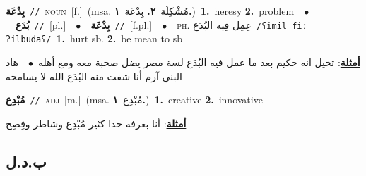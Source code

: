 \documentclass[10pt,a4paper,twoside]{article} %
\begin{document}
\begin{multicols}{2}
{\setlength\topsep{0pt}\textbf{\foreignlanguage{arabic}{بِدْعَة}}\ {\color{gray}\texttt{//}\color{black}}\ \textsc{noun}\ [f.]\ \color{gray}(msa. \foreignlanguage{arabic}{مُشْكِلَة}~\foreignlanguage{arabic}{\textbf{٢.}}  \foreignlanguage{arabic}{بِدْعَة}~\foreignlanguage{arabic}{\textbf{١.}})\color{black}\ \textbf{1.}~heresy  \textbf{2.}~problem\ \ $\bullet$\ \ \setlength\topsep{0pt}\textbf{\foreignlanguage{arabic}{بُدَع}}\ {\color{gray}\texttt{//}\color{black}}\ [pl.]\ \ $\bullet$\ \ \setlength\topsep{0pt}\textbf{\foreignlanguage{arabic}{بِدْعَة}}\ {\color{gray}\texttt{//}\color{black}}\ [f.pl.]\ \ $\bullet$\ \ \textsc{ph.} \color{gray} \foreignlanguage{arabic}{عِمِل فِيه البُدَع}\color{black}\ {\color{gray}\texttt{/{\sffamily ʕimil fiː ʔilbudaʕ}/}\color{black}}\ \textbf{1.}~hurt sb.  \textbf{2.}~be mean to sb\  \begin{flushright}\color{gray}\foreignlanguage{arabic}{\textbf{\underline{\foreignlanguage{arabic}{أمثلة}}}: تخيل انه حكيم بعد ما عمل فيه البُدَع لسة مصر يضل صحبة معه ومع أهله\ $\bullet$\ \  هاد البني آرم أنا شفت منه البُدَع الله لا يسامحه}\end{flushright}\color{black}} \vspace{2mm}

{\setlength\topsep{0pt}\textbf{\foreignlanguage{arabic}{مُبْدِع}}\ {\color{gray}\texttt{//}\color{black}}\ \textsc{adj}\ [m.]\ \color{gray}(msa. \foreignlanguage{arabic}{مُبْدِع}~\foreignlanguage{arabic}{\textbf{١.}})\color{black}\ \textbf{1.}~creative  \textbf{2.}~innovative\  \begin{flushright}\color{gray}\foreignlanguage{arabic}{\textbf{\underline{\foreignlanguage{arabic}{أمثلة}}}: أنا بعرفه حدا كثير مُبْدِع وشاطر وفِصِح}\end{flushright}\color{black}} \vspace{2mm}

\vspace{-3mm}
\subsection*{\color{blue}\foreignlanguage{arabic}{ب.د.ل}\color{blue}{}} 


\end{multicols}
\end{document}
